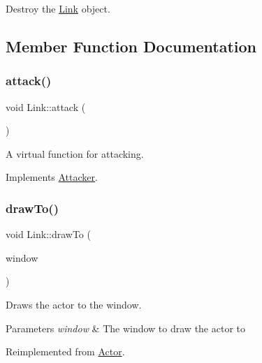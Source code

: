 Destroy the \mbox{\hyperlink{classLink}{Link}} object. 



\subsection{Member Function Documentation}
\mbox{\label{classLink_a0d56dc31b6bf76258f50a393e92f46c4}} 
\subsubsection{\texorpdfstring{attack()}{attack()}}
{\footnotesize\ttfamily void Link\+::attack (\begin{DoxyParamCaption}{ }\end{DoxyParamCaption})\hspace{0.3cm}{\ttfamily [virtual]}}



A virtual function for attacking. 



Implements \mbox{\hyperlink{structAttacker_a4ce0aa08a102bd688d9a47322a830173}{Attacker}}.

\mbox{\label{classLink_ac91a924fdf779fa02d477b7f60dbdc1e}} 
\subsubsection{\texorpdfstring{drawTo()}{drawTo()}}
{\footnotesize\ttfamily void Link\+::draw\+To (\begin{DoxyParamCaption}\item[{sf\+::\+Render\+Window \&}]{window }\end{DoxyParamCaption})\hspace{0.3cm}{\ttfamily [virtual]}}



Draws the actor to the window. 


\begin{DoxyParams}{Parameters}
{\em window} & The window to draw the actor to \\
\hline
\end{DoxyParams}


Reimplemented from \mbox{\hyperlink{classActor_af73a6f6670f0507c9e55ec2f61293535}{Actor}}.

